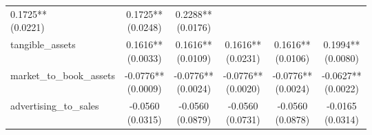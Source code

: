 \documentclass{article}
\begin{document}
\begin{longtable}{@{\extracolsep{\fill}}lccccc}
    \makecell{0.1725**                                                            \\(0.0221)} &
    \makecell{0.1725**                                                            \\(0.0248)} &
    \makecell{0.2288**                                                            \\(0.0176)} \\
    tangible\_assets              &
    \makecell{0.1616**                                                            \\(0.0033)} &
    \makecell{0.1616**                                                            \\(0.0109)} &
    \makecell{0.1616**                                                            \\(0.0231)} &
    \makecell{0.1616**                                                            \\(0.0106)} &
    \makecell{0.1994**                                                            \\(0.0080)} \\
    market\_to\_book\_assets      &
    \makecell{-0.0776**                                                           \\(0.0009)} &
    \makecell{-0.0776**                                                           \\(0.0024)} &
    \makecell{-0.0776**                                                           \\(0.0020)} &
    \makecell{-0.0776**                                                           \\(0.0024)} &
    \makecell{-0.0627**                                                           \\(0.0022)} \\
    advertising\_to\_sales        &
    \makecell{-0.0560                                                             \\(0.0315)} &
    \makecell{-0.0560                                                             \\(0.0879)} &
    \makecell{-0.0560                                                             \\(0.0731)} &
    \makecell{-0.0560                                                             \\(0.0878)} &
    \makecell{-0.0165                                                             \\(0.0314)} \\

\end{longtable}
\end{document}
